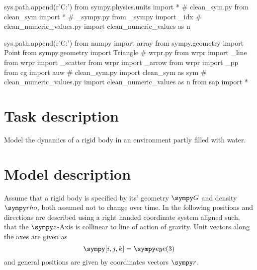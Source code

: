 
\tableofcontents

\begin{sympycode}
sys.path.append(r'C:\Users\Murad\evrythg')
from sympy.physics.units import *
# clean_sym.py
from clean_sym import *
# _sympy.py 
from _sympy import _idx
# clean_numeric_values.py
import clean_numeric_values as n
\end{sympycode}

\begin{pylabcode}
sys.path.append(r'C:\Users\Murad\evrythg')
from numpy import array
from sympy.geometry import Point
from sympy.geometry import Triangle
# wrpr.py
from wrpr import _line
from wrpr import _scatter
from wrpr import _arrow
from wrpr import _pp
from cg import  auw
# clean_sym.py
import clean_sym as sym
# clean_numeric_values.py
import clean_numeric_values as n
from sap import *
\end{pylabcode}


\section{Task description}
Model the dynamics of a rigid body in an environment partly filled with water.
\section{Model description}
Assume that a rigid body is specified by its' geometry $\s{G}$ and density $\s{rho}$, both assumed not to change over time.    In the following positions and directions are described using a right handed coordinate system aligned such, that the $\s{z}$-Axis is collinear to line of action of gravity.  Unit vectors along the axes are given as
\begin{equation*}
\s{[i, j, k]} = \s{eye(3)}
\end{equation*}
and general positions are given by coordinates vectors $\s{r}$.  

